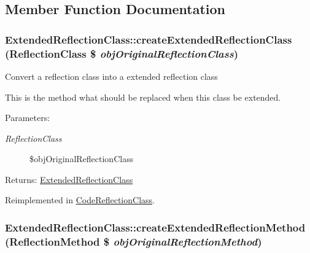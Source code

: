 \subsection{Member Function Documentation}
\hypertarget{class_extended_reflection_class_851f69035820c89d0ba918a277d2a29f}{
\subsubsection[{createExtendedReflectionClass}]{\setlength{\rightskip}{0pt plus 5cm}ExtendedReflectionClass::createExtendedReflectionClass (ReflectionClass \$ {\em objOriginalReflectionClass})}}
\label{class_extended_reflection_class_851f69035820c89d0ba918a277d2a29f}


Convert a reflection class into a extended reflection class

This is the method what should be replaced when this class be extended.

\begin{Desc}
\item[Parameters:]
\begin{description}
\item[{\em ReflectionClass}]\$objOriginalReflectionClass \end{description}
\end{Desc}
\begin{Desc}
\item[Returns:]\hyperlink{class_extended_reflection_class}{ExtendedReflectionClass} \end{Desc}


Reimplemented in \hyperlink{class_code_reflection_class_496631cb5814727379cdacb689e4c40a}{CodeReflectionClass}.\hypertarget{class_extended_reflection_class_922598bd80a21577ccad6d4ca4138474}{
\subsubsection[{createExtendedReflectionMethod}]{\setlength{\rightskip}{0pt plus 5cm}ExtendedReflectionClass::createExtendedReflectionMethod (ReflectionMethod \$ {\em objOriginalReflectionMethod})}}
\label{class_extended_reflection_class_922598bd80a21577ccad6d4ca4138474}


